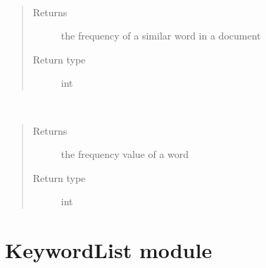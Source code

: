 \documentclass[letterpaper,10pt,english]{sphinxmanual}
\begin{document}
\begin{fulllineitems}
\begin{fulllineitems}
\end{fulllineitems}


\begin{fulllineitems}
\label{\detokenize{Keyword:Keyword.Keyword.similarwordfrequency}}~\begin{quote}\begin{description}
\item[{Returns}] \leavevmode
the frequency of a similar word in a document

\item[{Return type}] \leavevmode
int

\end{description}\end{quote}

\end{fulllineitems}


\begin{fulllineitems}
\label{\detokenize{Keyword:Keyword.Keyword.wordfrequency}}~\begin{quote}\begin{description}
\item[{Returns}] \leavevmode
the frequency value of a word

\item[{Return type}] \leavevmode
int

\end{description}\end{quote}

\end{fulllineitems}


\end{fulllineitems}



\chapter{KeywordList module}
\label{\detokenize{KeywordList:module-KeywordList}}\label{\detokenize{KeywordList::doc}}\label{\detokenize{KeywordList:keywordlist-module}}
\end{document}
